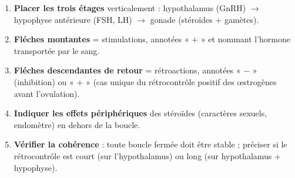 \documentclass[11pt]{article}
\begin{document}
\begin{methode}
\begin{enumerate}
\item \textbf{Placer les trois étages} verticalement : hypothalamus (GnRH) $\rightarrow$ hypophyse antérieure (FSH, LH) $\rightarrow$ gonade (stéroïdes + gamètes).
\item \textbf{Fléches montantes} = stimulations, annotées « $+$ » et nommant l'hormone transportée par le sang.
\item \textbf{Fléches descendantes de retour} = rétroactions, annotées « $-$ » (inhibition) ou « $+$ » (cas unique du rétrocontrôle positif des \oe{}strogènes avant l'ovulation).
\item \textbf{Indiquer les effets périphériques} des stéroïdes (caractères sexuels, endomètre) en dehors de la boucle.
\item \textbf{Vérifier la cohérence} : toute boucle fermée doit être stable ; préciser si le rétrocontrôle est court (sur l'hypothalamus) ou long (sur hypothalamus + hypophyse).
\end{enumerate}
\end{methode}
\end{document}
